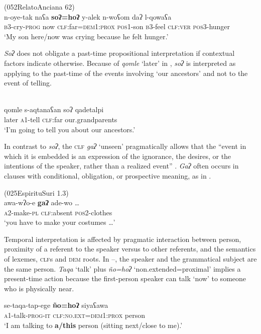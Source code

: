 \documentclass[output=paper,colorlinks,citecolor=brown]{langscibook}
\begin{document}
\ea\label{ex:payne:76} (052RelatoAnciana 62)\\
\gll  n-oye-tak  naʕa  \textbf{soʔ=hoʔ}  y-alek n-woʕom  daʔ  l-qowaʕa\\
 \textsc{b3}-cry-\textsc{prog} now \textsc{clf}:far=\textsc{dem1:prox}  \textsc{pos1}-son \textsc{b3}-feel \textsc{clf:ver}  \textsc{pos3}-hunger\\
\glt ‘My son here/now was crying because he felt hunger.’ 
\z

\textit{Soʔ} does not obligate a past-time propositional interpretation if contextual factors indicate otherwise. Because of \textit{qomle} ‘later’ in , \textit{soʔ} is interpreted as applying to the past-time of the events involving ‘our ancestors’ and not to the event of telling.

\ea\label{ex:payne:77} \citep[1353]{VidalGutiérrez2010}\\
\gll  qomle  s-aqtanaʕan  soʔ  qadetalpi\\
later  \textsc{a1}-tell  \textsc{clf}:far our.grandparents\\
\glt ‘I’m going to tell you about our ancestors.’ 
\z

In contrast to \textit{soʔ}, the \textsc{clf} \textit{gaʔ} ‘unseen’ pragmatically allows that the “event in which it is embedded is an expression of the ignorance, the desires, or the intentions of the speaker, rather than a realized event” \citep[176]{VidalKlein1998}. \textit{Gaʔ} often occurs in clauses with conditional, obligation, or prospective meaning, as in .

\ea\label{ex:payne:78} (025EspirituSuri 1.3)\\
\gll  awa-wʔo-e  \textbf{gaʔ}  ade-wo …\\
 \textsc{a2}-make-\textsc{pl}  \textsc{clf}:absent \textsc{pos2}-clothes\\
\glt ‘you have to make your costumes …’ 
\z

Temporal interpretation is affected by pragmatic interaction between person, proximity of a referent to the speaker versus to other referents, and the semantics of lexemes, \textsc{clf}s and \textsc{dem} roots. In –, the speaker and the grammatical subject are the same person. \textit{Taqa} ‘talk’ plus \textit{ño=hoʔ} ‘non.extended=proximal’ implies a present-time action because the first-person speaker can talk ‘now’ to someone who is physically near.

\ea\label{ex:payne:79}
\gll  se-taqa-tap-ege  \textbf{ño=hoʔ}  siyaʕawa\\
 \textsc{a1}-talk-\textsc{prog-it}  \textsc{clf:no.ext=dem1:prox} person\\
\glt ‘I am talking to \textbf{a/this} person (sitting next/close to me).’
\z
\end{document}
